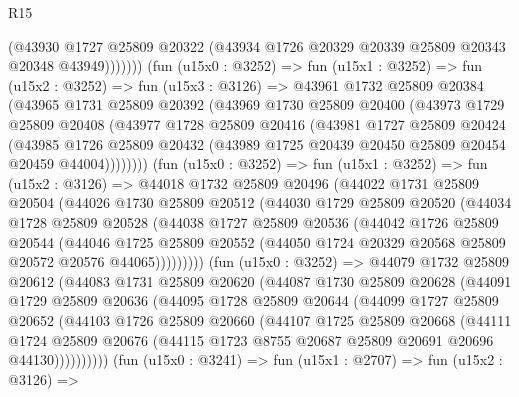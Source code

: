 \begin{lexlean}{R15}
\begin{coremodule}
              (@43930
                @1727
                @25809
                @20322
                (@43934 @1726 @20329 @20339 @25809 @20343 @20348 @43949)))))))
    (fun (u15x0 : @3252) =>
    fun (u15x1 : @3252) =>
    fun (u15x2 : @3252) =>
    fun (u15x3 : @3126) =>
    @43961
      @1732
      @25809
      @20384
      (@43965
        @1731
        @25809
        @20392
        (@43969
          @1730
          @25809
          @20400
          (@43973
            @1729
            @25809
            @20408
            (@43977
              @1728
              @25809
              @20416
              (@43981
                @1727
                @25809
                @20424
                (@43985
                  @1726
                  @25809
                  @20432
                  (@43989 @1725 @20439 @20450 @25809 @20454 @20459 @44004))))))))
    (fun (u15x0 : @3252) =>
    fun (u15x1 : @3252) =>
    fun (u15x2 : @3126) =>
    @44018
      @1732
      @25809
      @20496
      (@44022
        @1731
        @25809
        @20504
        (@44026
          @1730
          @25809
          @20512
          (@44030
            @1729
            @25809
            @20520
            (@44034
              @1728
              @25809
              @20528
              (@44038
                @1727
                @25809
                @20536
                (@44042
                  @1726
                  @25809
                  @20544
                  (@44046
                    @1725
                    @25809
                    @20552
                    (@44050 @1724 @20329 @20568 @25809 @20572 @20576 @44065)))))))))
    (fun (u15x0 : @3252) =>
    @44079
      @1732
      @25809
      @20612
      (@44083
        @1731
        @25809
        @20620
        (@44087
          @1730
          @25809
          @20628
          (@44091
            @1729
            @25809
            @20636
            (@44095
              @1728
              @25809
              @20644
              (@44099
                @1727
                @25809
                @20652
                (@44103
                  @1726
                  @25809
                  @20660
                  (@44107
                    @1725
                    @25809
                    @20668
                    (@44111
                      @1724
                      @25809
                      @20676
                      (@44115 @1723 @8755 @20687 @25809 @20691 @20696 @44130))))))))))
    (fun (u15x0 : @3241) =>
    fun (u15x1 : @2707) =>
    fun (u15x2 : @3126) =>

\end{coremodule}
\end{lexlean}
